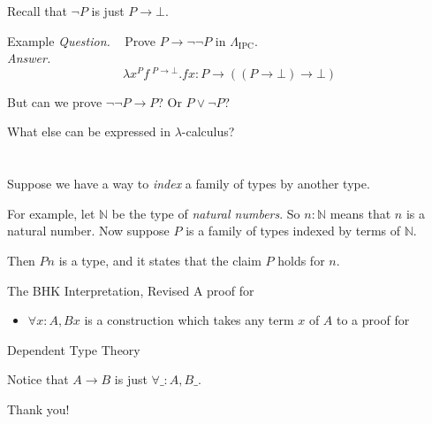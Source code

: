 \documentclass{beamer}
\begin{document}
\begin{frame}{\subIntLog}
	Recall that $\neg P$ is just $P \to \bot$.
	\begin{exampleblock}{Example}
		\emph{Question. }~ Prove $P \to \neg \neg P$ in $\Lambda_\text{IPC}$.\\
		\pause
		\emph{Answer. }\quad
		\[ \lambda x^P f~^{P \to \bot} . f x : P \to ((P \to \bot) \to \bot) \]
	\end{exampleblock}
	\pause
	But can we prove $\neg \neg P \to P$? Or $P \vee \neg P$?
\end{frame}

\begin{frame}{}
	What else can be expressed in $\lambda$-calculus?
\end{frame}

\section{\secDep}

\begin{frame}{\subDepFun}
	Suppose we have a way to \emph{index} a family of types by another type.
	
	\pause
	For example, let $\mathbb{N}$ be the type of \emph{natural numbers}. So $n : \mathbb{N}$ means that $n$ is a natural number. Now suppose $P$ is a family of types indexed by terms of $\mathbb{N}$.

	\pause
	Then $P n$ is a type, and it states that the claim $P$ holds for $n$.
	\begin{block}{The BHK Interpretation, Revised}
		A proof for
		\begin{itemize}
			\item $\forall x : A, B x$ is a construction which takes any term $x$ of $A$ to a proof for 
		\end{itemize}
	\end{block}
\end{frame}

\begin{frame}{\subDepFun}
	\begin{block}{Dependent Type Theory}
		\begin{prooftree}

			\noLine\BIC{}
		\end{prooftree}
	\end{block}

	\pause
	Notice that $A \to B$ is just $\forall \_ : A, B \_$.
\end{frame}




\begin{frame}[noframenumbering]{\quad}
	\begin{center}
		\Huge Thank you!
	\end{center}
\end{frame}
\end{document}

